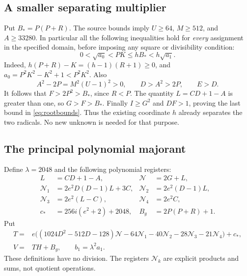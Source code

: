 \subsection{A smaller separating multiplier}
Put $B_*=P(P+R)$. The source bounds imply $U\ge64$, $M\ge512$, and
$A\ge33280$. In particular all the following inequalities hold for
\emph{every} assignment in the specified domain, before imposing any
square or divisibility condition:
\begin{equation}\label{eq:rootbounds}
 0<\sqrt{a_0}<PK\le hB_*<h\sqrt{a_1}.
\end{equation}
Indeed, $h(P+R)-K=(h-1)(R+1)\ge0$, and
$a_0=P^2K^2-K^2+1<P^2K^2$. Also
\[
 A^2-2P=M^2(U-1)^2>0,\qquad D>A^2>2P,\qquad E>D.
\]
It follows that $F>2P^2>B_*$, since $R<P$.
The quantity $L=CD+1-A$ is greater than one, so $G>F>B_*$.
Finally $I\ge G^2$ and $DF>1$, proving the last bound in
\eqref{eq:rootbounds}. Thus the existing coordinate $h$ already separates
the two radicals. No new unknown is needed for that purpose.

\subsection{The principal polynomial majorant}
Define $\lambda=2048$ and the following polynomial registers:
\begin{align*}
 L&=CD+1-A,& \mathcal N&=2G+L,\\
 \mathcal N_1&=2e^2D(D-1)L+3C,&
 \mathcal N_2&=2e^2(D-1)L,\\
 \mathcal N_3&=2e^2(L-C),& \mathcal N_4&=2e^2C,\\
 c_*&=256i(e^2+2)+2048,& B_g&=2P(P+R)+1.
\end{align*}
Put
\begin{align}
 T={}&e\bigl((1024D^2-512D-128)\mathcal N
       -64\mathcal N_1-40\mathcal N_2
       -28\mathcal N_3-21\mathcal N_4\bigr)+c_*,\label{eq:Tmajor}\\
 V={}&TH+B_g,\qquad b_1=\lambda^2a_1.\label{eq:Vmajor}
\end{align}
These definitions have no division. The registers $\mathcal N_k$ are
explicit products and sums, not quotient operations.

